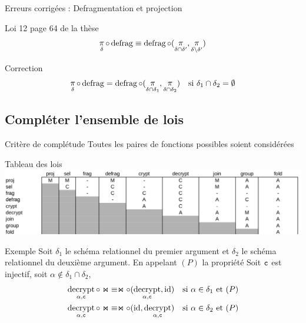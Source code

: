 \documentclass{beamer}
\DeclareMathOperator{\proj}{\mathchar"1119}
\DeclareMathOperator{\defrag}{defrag}
\DeclareMathOperator{\decrypt}{decrypt}
\DeclareMathOperator{\id}{id}
\newcommand\typeT[1]{\text{\ttfamily #1}}
\newcommand{\decryptArgs}[2]{\decrypt_{#1 , \typeT{#2}}}
\newcommand{\projDelta}{\proj_{\delta}}
\newcommand{\decryptCAlpha}{\decryptArgs{\alpha}{c}}
\newcommand{\ch}{\typeT{c}}
\begin{document}
\begin{frame}{Erreurs corrigées : Defragmentation et projection}
\begin{block}{Loi 12 page 64 de la thèse}
$$
\projDelta \circ \defrag
\equiv \defrag \circ (\proj_{\delta \cap \delta'} , \proj_{\delta \setminus \delta'})
$$
\end{block}
\begin{exampleblock}{Correction}
\begin{align*}
\projDelta \circ \defrag
& = \defrag \circ (\proj_{\delta \cap \delta_1}, \proj_{\delta \cap \delta_2})
& \text{si $\delta_1 \cap \delta_2 = \emptyset$}
\end{align*}
\end{exampleblock}
\end{frame}

\subsection{Compléter l'ensemble de lois}
\begin{frame}{Critère de complétude}
Toutes les paires de fonctions possibles soient considérées
\end{frame}

\begin{frame}{Tableau des lois}
\includegraphics[width=\textwidth]{complLoisBilan.png}
\end{frame}

\begin{frame}{Exemple}
Soit $\delta_1$ le schéma relationnel du premier
	argument et $\delta_2$ le schéma relationnel du deuxième
	argument.
En appelant $(P)$ la propriété
\og Soit $\ch$ est injectif, soit $\alpha \notin \delta_1 \cap \delta_2$\fg{},
\begin{align}
\decryptCAlpha \circ \Join
& \equiv
\Join \circ (\decryptCAlpha, \id)
& \text{si $\alpha \in \delta_1$ et $(P)$} \\
\decryptCAlpha \circ \Join
& \equiv
\Join \circ (\id, \decryptCAlpha)
& \text{si $\alpha \in \delta_2$ et $(P)$} 
\end{align}
\end{frame}
\end{document}
